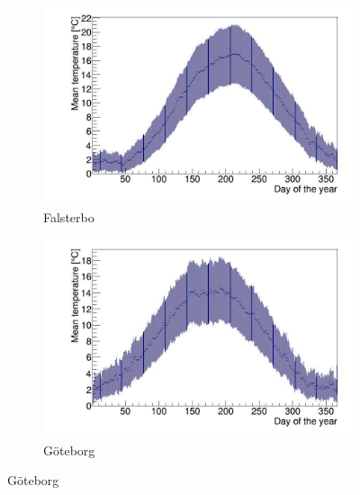 \begin{figure}
    \centering
    \begin{subfigure}[b]{0.49\textwidth}
    \centering
    \includegraphics[width=\textwidth]{FAL_A.jpg}
        \caption{Falsterbo}
    \end{subfigure}
    \hfill
    \begin{subfigure}[b]{0.49\textwidth}
    \centering
    \includegraphics[width=\textwidth]{GBG_A.jpg}
        \caption{Göteborg}
    \end{subfigure}
    

\end{figure}
